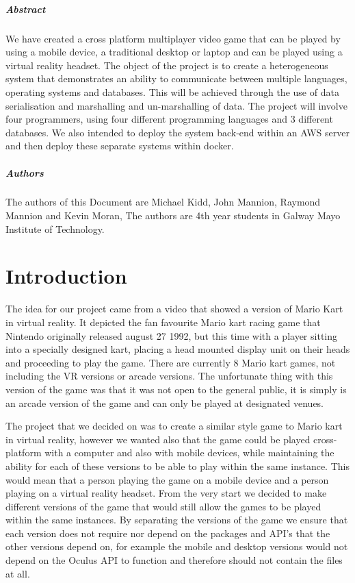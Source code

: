 
\newpage
\paragraph{Abstract}
We have created a cross platform multiplayer video game that can be played by using a mobile device, a traditional desktop or laptop and can be played using a virtual reality headset. The object of the project is to create a heterogeneous system that demonstrates an ability to communicate between multiple languages, operating systems and databases. This will be achieved through the use of data serialisation and marshalling and un-marshalling of data. The project will involve four programmers, using four different programming languages and 3 different databases. We also intended to deploy the system back-end within an AWS server and then deploy these separate systems within docker.

\paragraph{Authors}
The authors of this Document are Michael Kidd, John Mannion, Raymond Mannion and Kevin Moran, The authors are 4th year students in Galway Mayo Institute of Technology.

\chapter{Introduction}
The idea for our project came from a video that showed a version of Mario Kart in virtual reality. It depicted the fan favourite Mario kart racing game that Nintendo originally released august 27 1992, but this time with a player sitting into a specially designed kart, placing a head mounted display unit on their heads and proceeding to play the game. There are currently 8 Mario kart games, not including the VR versions or arcade versions. The unfortunate thing with this version of the game was that it was not open to the general public, it is simply is an arcade version of the game and can only be played at designated venues.\newline

The project that we decided on was to create a similar style game to Mario kart in virtual reality, however we wanted also that the game could be played cross-platform with a computer and also with mobile devices, while maintaining the ability for each of these versions to be able to play within the same instance. This would mean that a person playing the game on a mobile device and a person playing on a virtual reality headset. From the very start we decided to make different versions of the game that would still allow the games to be played within the same instances. By separating the versions of the game we ensure that each version does not require nor depend on the packages and API's that the other versions depend on, for example the mobile and desktop versions would not depend on the Oculus API to function and therefore should not contain the files at all. \newline


